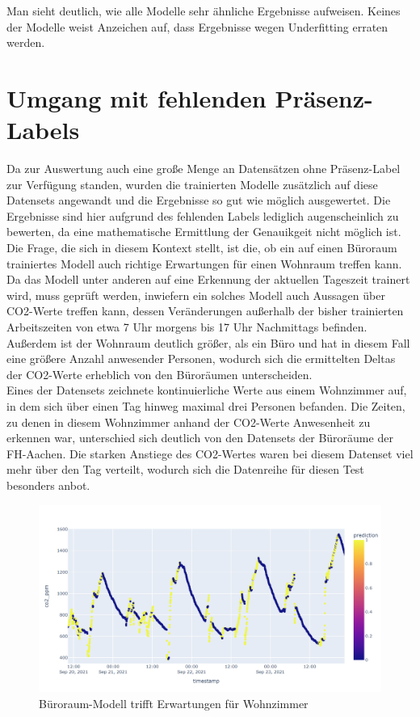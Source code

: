 Man sieht deutlich, wie alle Modelle sehr ähnliche Ergebnisse aufweisen. Keines der Modelle weist Anzeichen 
auf, dass Ergebnisse wegen Underfitting erraten werden.

\section{Umgang mit fehlenden Präsenz-Labels}
Da zur Auswertung auch eine große Menge an Datensätzen ohne Präsenz-Label zur Verfügung standen, wurden die trainierten
Modelle zusätzlich auf diese Datensets angewandt und die Ergebnisse so gut wie möglich ausgewertet. Die Ergebnisse
sind hier aufgrund des fehlenden Labels lediglich augenscheinlich zu bewerten, da eine mathematische Ermittlung
der Genauikgeit nicht möglich ist.\\
Die Frage, die sich in diesem Kontext stellt, ist die, ob ein auf einen Büroraum trainiertes Modell auch richtige
Erwartungen für einen Wohnraum treffen kann.
Da das Modell unter anderen auf eine Erkennung der aktuellen Tageszeit trainert wird, muss geprüft
werden, inwiefern ein solches Modell auch Aussagen über CO2-Werte treffen kann, dessen Veränderungen außerhalb
der bisher trainierten Arbeitszeiten von etwa 7 Uhr morgens bis 17 Uhr Nachmittags befinden. 
Außerdem ist der Wohnraum deutlich größer, als ein Büro und hat in diesem Fall eine größere Anzahl anwesender
Personen, wodurch sich die ermittelten Deltas der CO2-Werte erheblich von den Büroräumen unterscheiden.\\
Eines der Datensets zeichnete kontinuierliche Werte aus einem Wohnzimmer auf, in dem sich über einen 
Tag hinweg maximal drei Personen befanden. Die Zeiten, zu denen in diesem Wohnzimmer anhand der CO2-Werte
Anwesenheit zu erkennen war, unterschied sich deutlich von den Datensets der Büroräume der FH-Aachen. Die 
starken Anstiege des CO2-Wertes waren bei diesem Datenset viel mehr über den Tag verteilt, wodurch sich die 
Datenreihe für diesen Test besonders anbot.

\begin{figure}[h]
    \centering
    \includegraphics[width=1.0\textwidth]{pic/h217_predicting_livingroom.png}
    \caption{Büroraum-Modell trifft Erwartungen für Wohnzimmer}
    \label{fig:PT_eval}
\end{figure}

